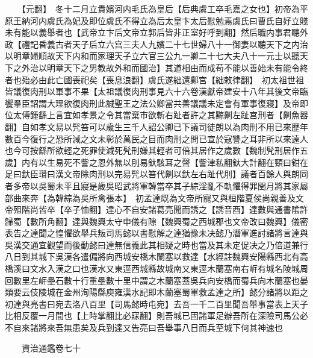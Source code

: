 　　【元翻】　冬十二月立貴嬪河内毛氏為皇后【后典虞工卒毛嘉之女也】初帝為平原王納河内虞氏為妃及即位虞氏不得立為后太皇卞太后慰勉焉虞氏曰曹氏自好立賤未有能以義舉者也【武帝立卞后文帝立郭后皆非正室好呼到翻】然后職内事君聽外政【禮記昏義古者天子后立六宫三夫人九嬪二十七世婦八十一御妻以聽天下之内治以明章婦順故天下内和而家理天子立六官三公九一卿二十七大夫八十一元士以聽天下之外治以明章天下之男教故外和而國治】其道相由而成苟不能以善始未有能令終者也殆必由此亡國喪祀矣【喪息浪翻】虞氏遂絀還鄴宫【絀敕律翻】　初太祖世祖皆議復肉刑以軍事不果【太祖議復肉刑事見六十六卷漢獻帝建安十八年其後文帝臨饗羣臣詔謂大理欲復肉刑此誠聖王之法公卿當共善議議未定會有軍事復寢】及帝即位太傅鍾繇上言宜如孝景之令其當棄市欲斬右趾者許之其黥劓左趾宫刑者【劓魚器翻】自如孝文易以髠笞可以歲生三千人詔公卿已下議司徒朗以為肉刑不用已來歷年數百今復行之恐所減之文未彰於萬民之目而肉刑之問已宣於寇讐之耳非所以來遠人也今可按繇所欲輕之死罪使減死髠刑嫌其輕者可倍其居作之歲數【魏制髠刑居作五歲】内有以生易死不訾之恩外無以刖易釱駭耳之聲【訾津私翻釱大計翻在頸曰鉗在足曰釱臣瓚曰漢文帝除肉刑以完易髠以笞代劓以釱左右趾代刖】議者百餘人與朗同者多帝以吳蜀未平且寢是歲吳昭武將軍韓當卒其子綜淫亂不軌懼得罪閏月將其家屬部曲來奔【為韓綜為吳所禽張本】　初孟達既為文帝所寵又與桓階夏侯尚親善及文帝殂階尚皆卒【卒子恤翻】達心不自安諸葛亮聞而誘之【誘音酉】達數與通書隂許歸蜀【數所角翻】達與魏興太守申儀有隙【魏興蜀之西城郡也文帝改曰魏興】儀密表告之達聞之惶懼欲舉兵叛司馬懿以書慰解之達猶豫未决懿乃潛軍進討諸將言達與吳漢交通宜觀望而後動懿曰達無信義此其相疑之時也當及其未定促决之乃倍道兼行八日到其城下吳漢各遣偏將向西城安橋木闌塞以救達【水經註魏興安陽縣西北有高橋溪曰文水入漢之口也漢水又東逕西城縣故城南又東逕木蘭塞南右㟁有城名陵城周回數里左㟁壘石數十行重壘數十里中謂之木蘭塞蓋吳兵向安橋而蜀兵向木蘭塞也晏類要云伎陵城在金州洵陽縣庾雍漢水記即木蘭塞蜀軍救孟達之所】懿分諸將以距之初達與亮書曰宛去洛八百里【司馬懿時屯宛】去吾一千二百里聞吾舉事當表上天子比相反覆一月間也【上時掌翻比必寐翻】則吾城已固諸軍足辦吾所在深險司馬公必不自來諸將來吾無患矣及兵到達又告亮曰吾舉事八日而兵至城下何其神速也

　　資治通鑑卷七十  
    


 


 



 

 
  







 


　　
　　
　
　
　


